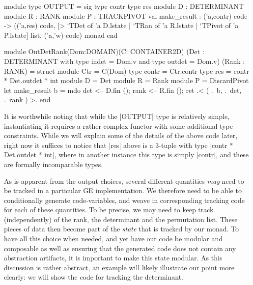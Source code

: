 \documentclass{llncs}
\begin{document}
\begin{small}
\begin{code}
module type OUTPUT = sig
  type contr
  type res
  module D : DETERMINANT
  module R : RANK
  module P : TRACKPIVOT
  val make_result : ('a,contr) code -> 
    (('a,res) code,
     [> `TDet of 'a D.lstate | `TRan of 'a R.lstate | `TPivot of 'a P.lstate]
       list,
     ('a,'w) code) monad
end

module OutDetRank(Dom:DOMAIN)(C: CONTAINER2D)
    (Det : DETERMINANT with type indet = Dom.v and type outdet = Dom.v)
    (Rank : RANK) =
  struct
  module Ctr = C(Dom)
  type contr = Ctr.contr
  type res = contr * Det.outdet * int
  module D = Det
  module R = Rank
  module P = DiscardPivot
  let make_result b = mdo {
    det  <-- D.fin ();
    rank <-- R.fin ();
    ret .< ( .~b, .~det, .~rank ) >. }
end
\end{code}
\end{small}
\noindent It is worthwhile noting that while the |OUTPUT| type is
relatively simple, instantiating it requires a rather complex functor
with some additional type constraints.  While we will explain some of
the details of the above code later, right now it suffices to notice
that |res| above is a 3-tuple with type |contr * Det.outdet * int|,
where in another instance this type is simply |contr|, and these are
formally incomparable types.

As is apparent from the output choices, several different quantities
\emph{may} need to be tracked in a particular GE implementation.
We therefore need to be able to conditionally generate code-variables,
and weave in corresponding tracking code for each of these quantities.
To be precise, we may need to keep track (independently) of the rank,
the determinant and the permutation list.  These pieces of data then
become part of the \emph{state} that is tracked by our monad.  To have
all this choice when needed, and yet have our code be modular and
composable as well as ensuring that the generated code does not 
contain any abstraction artifacts, it is important to make this 
state modular.  As this discussion is rather abstract, an example
will likely illustrate our point more clearly: we will show the 
code for tracking the determinant.
\end{document}
